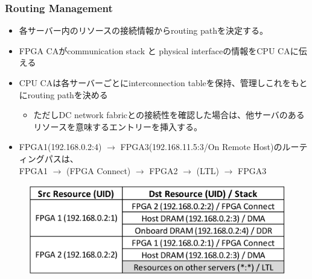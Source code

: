\documentclass[dvipdfmx,9pt,notheorems]{beamer}
\theoremstyle{definition}
\begin{document}



\begin{frame}\frametitle{Routing Management}
	\begin{itemize}
		\item 各サーバー内のリソースの接続情報からrouting pathを決定する。
		\item FPGA CAがcommunication stack と physical interfaceの情報をCPU CAに伝える
		\item CPU CAは各サーバーごとにinterconnection tableを保持、管理しこれをもとにrouting pathを決める
			\begin{itemize}
				\item ただしDC network fabricとの接続性を確認した場合は、他サーバのあるリソースを意味するエントリーを挿入する。
			\end{itemize}
		\item FPGA1(192.168.0.2:4) $\rightarrow$ FPGA3(192.168.11.5:3/On Remote Host)のルーティングパスは、\\ {\color{orange} FPGA1 $\rightarrow$ (FPGA Connect) $\rightarrow$ FPGA2 $\rightarrow$ (LTL) $\rightarrow$ FPGA3}
	\end{itemize}
  \begin{figure}[htb]
		\includegraphics[scale=1.0]{fig/figure5.png}
  \end{figure}
\pnote{
}
\end{frame}
\end{document}
